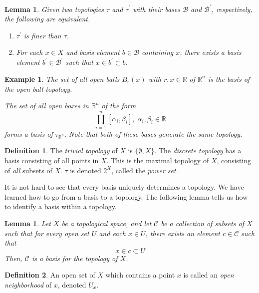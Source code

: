 \documentclass{article}
\newtheorem{lemma}[theorem]{Lemma}
\newtheorem{example}{Example}[section]
\theoremstyle{remark}
\theoremstyle{definition}
\newtheorem{definition}{Definition}[section]
\begin{document}
\begin{lemma}
Given two topologies $\tau$ and $\tau^\prime$ with their bases $\mathscr{B}$ and $\mathscr{B}^\prime$, respectively, the following are equivalent. 
\begin{enumerate}
    \item $\tau^\prime$ is finer than $\tau$. 
    \item For each $x \in X$ and basis element $b \in \mathscr{B}$ containing $x$, there exists a basis element $b^\prime \in \mathscr{B}^\prime$ such that $x \in b^\prime \subset b$. 
\end{enumerate}
\end{lemma}

\begin{example}
The set of all open balls $B_r (x)$ with $r, x \in \mathbb{R}$ of $\mathbb{R}^n$ is the basis of the open ball topology. 

The set of all open boxes in $\mathbb{R}^{n}$ of the form 
\[\prod_{i=1}^n [\alpha_i, \beta_i], \; \alpha_i, \beta_i \in \mathbb{R} \]
forms a basis of $\tau_{\mathbb{R}^{n}}$. Note that both of these bases generate the same topology. 
\end{example}

\begin{definition}
The \textit{trivial topology} of $X$ is $\{\emptyset, X\}$. The \textit{discrete topology} has a basis consisting of all points in $X$. This is the maximal topology of $X$, consisting of \textit{all} subsets of $X$. $\tau$ is denoted $2^{X}$, called the \textit{power set}.
\end{definition}

It is not hard to see that every basis uniquely determines a topology. We have learned how to go from a basis to a topology. The following lemma tells us how to identify a basis within a topology. 

\begin{lemma}
Let $X$ be a topological space, and let $\mathcal{C}$ be a collection of subsets of $X$ such that for every open set $U$ and each $x \in U$, there exists an element $c \in \mathcal{C}$ such that
\[x \in c \subset U\]
Then, $\mathcal{C}$ is a basis for the topology of $X$. 
\end{lemma}

\begin{definition}
An open set of $X$ which contains a point $x$ is called an \textit{open neighborhood} of $x$, denoted $U_x$. 
\end{definition}
\end{document}
